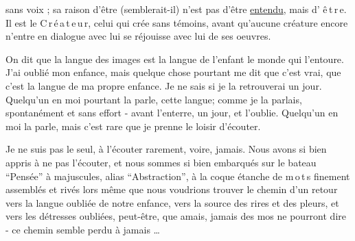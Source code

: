 
sans voix ;  sa raison d'être (semblerait-il) n'est pas d'être \uline{entendu}, mais d' \mbox{ê\,t\,r\,e}. Il est le \mbox{C\,r\,é\,a\,t\,e\,u\,r}, celui qui crée sans témoins, avant qu'aucune créature encore n'entre en dialogue avec lui   se réjouisse avec lui de ses oeuvres.

On dit que la langue des images est la langue de l'enfant\handwritten{,}  le monde qui l'entoure. J'ai  oublié mon enfance, mais quelque chose pourtant me dit que c'est  vrai, que c'est  la langue de ma propre enfance. Je ne sais si je la retrouverai un jour. Quelqu'un en moi pourtant la parle, cette langue; comme je la parlais, spontanément et sans effort - avant  l'enterre, un jour, et l'oublie. Quelqu'un en moi la parle, mais c'est rare que je prenne le loisir d'écouter.

Je ne suis pas le seul, à l'écouter rarement, voire, jamais. Nous avons si bien appris à ne pas l'écouter, et nous sommes si bien embarqués sur le bateau ``Pensée'' à majuscules, alias ``Abstraction'', à la coque étanche de \mbox{m\,o\,t\,s} finement assemblés et rivés \handwritten{!}  lors même que nous voudrions trouver le chemin d'un retour vers la langue oubliée de notre enfance, vers la source des rires et des pleurs, et vers les détresses oubliées, peut-être, que amais, jamais des mos ne pourront dire -  ce chemin semble perdu à jamais \ldots

